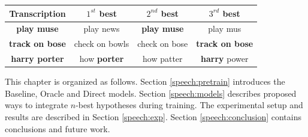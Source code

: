 



\begin{table}[t!]
	\label{tbl:expMotiv}
	\centering
		\begin{tabular}{|c|c|c|c|}
			\hline
			
			Transcription& $1^{st}$ best &$2^{nd}$ best&$3^{rd}$ best \\
			\hline
			\textbf{play muse}&play news&\textbf{play muse}&play mus\\
			\textbf{track on bose}&check on bowls& check on bose &\textbf{track on bose}\\
			\textbf{harry porter} & how \textbf{porter}& how patter&\textbf{harry} power\\
			\hline
			
		\end{tabular}
		

\end{table}


This chapter is organized as follows. Section \ref{speech:pretrain} introduces the Baseline, Oracle and Direct models. Section \ref{speech:models} describes proposed ways to integrate $n$-best hypotheses during training. The experimental setup and results are described in Section \ref{speech:exp}. Section \ref{speech:conclusion} contains conclusions and future work.


